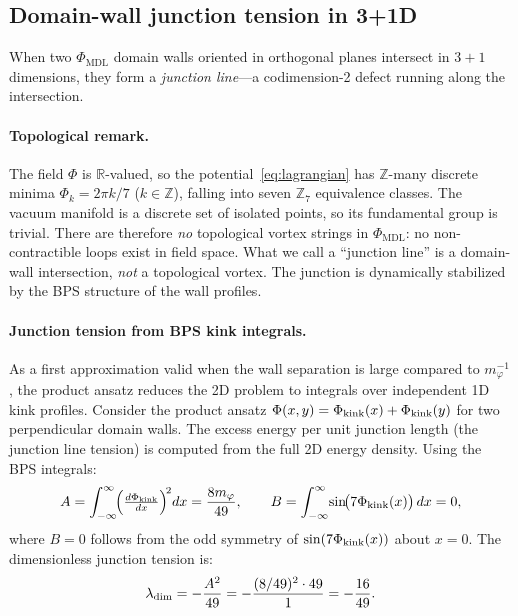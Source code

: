 \documentclass[11pt]{article}
\theoremstyle{remark}
\newcommand{\PHIMDL}{\Phi_{\mathrm{MDL}}}
\newcommand{\ZS}{\mathbb{Z}_7}
\begin{document}
\subsection{Domain-wall junction tension in 3+1D}
\label{ssec:junction}

When two $\PHIMDL$ domain walls oriented in orthogonal planes intersect in $3+1$
dimensions, they form a \emph{junction line}---a codimension-2 defect running
along the intersection.

\paragraph{Topological remark.}
The field $\Phi$ is $\mathbb{R}$-valued, so the
potential~\eqref{eq:lagrangian} has $\mathbb{Z}$-many discrete minima
$\Phi_k = 2\pi k/7$ ($k\in\mathbb{Z}$), falling into seven $\ZS$ equivalence
classes.  The vacuum manifold is a discrete set of isolated points, so its
fundamental group is trivial.  There are therefore \emph{no} topological
vortex strings in $\PHIMDL$: no non-contractible loops exist in field space.
What we call a ``junction line'' is a domain-wall intersection, \emph{not} a
topological vortex.  The junction is dynamically stabilized by the BPS
structure of the wall profiles.

\paragraph{Junction tension from BPS kink integrals.}
As a first approximation valid when the wall separation is large compared to
$m_\varphi^{-1}$, the product ansatz reduces the 2D problem to integrals over
independent 1D kink profiles.
Consider the product ansatz $\Phi(x,y) = \Phi_{\rm kink}(x) + \Phi_{\rm kink}(y)$ for
two perpendicular domain walls.  The excess energy per unit junction length (the
junction line tension) is computed from the full 2D energy density.  Using the
BPS integrals:
\begin{equation}
  A = \int_{-\infty}^{\infty}\!\Bigl(\tfrac{d\Phi_{\rm kink}}{dx}\Bigr)^{\!2}\!\,dx
    = \frac{8m_\varphi}{49}, \qquad
  B = \int_{-\infty}^{\infty}\!\sin\!\bigl(7\Phi_{\rm kink}(x)\bigr)\,dx = 0,
\end{equation}
where $B=0$ follows from the odd symmetry of $\sin(7\Phi_{\rm kink}(x))$ about
$x=0$.  The dimensionless junction tension is:
\begin{equation}
  \lambda_{\rm dim} = -\frac{A^2}{49} = -\frac{(8/49)^2 \cdot 49}{1}
  = -\frac{16}{49}.
  \label{eq:junction_dim}
\end{equation}
\end{document}
